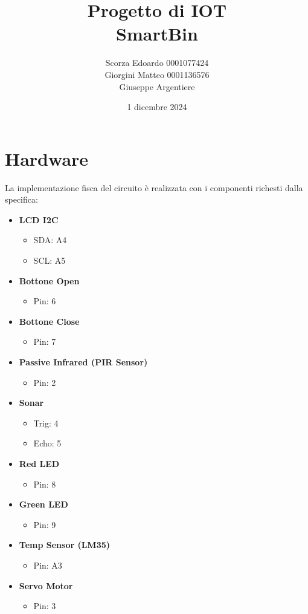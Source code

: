 \documentclass[a4paper,12pt]{report}
\title{Progetto di IOT
    \\ SmartBin}
\author{Scorza Edoardo 0001077424 \\ Giorgini Matteo 0001136576 \\ Giuseppe Argentiere }
\date{1 dicembre 2024}
\begin{document}
\maketitle
\tableofcontents
\chapter{Hardware}
La implementazione fisca del circuito è realizzata con i componenti 
richesti dalla specifica:
\begin{itemize}
    \item \textbf{LCD I2C}
    \begin{itemize}
        \item SDA: A4
        \item SCL: A5
    \end{itemize}
    \item \textbf{Bottone Open}
    \begin{itemize}
        \item Pin: 6
    \end{itemize}
    \item \textbf{Bottone Close}
    \begin{itemize}
        \item Pin: 7
    \end{itemize}
    \item \textbf{Passive Infrared (PIR Sensor)}
    \begin{itemize}
        \item Pin: 2
    \end{itemize}
    \item \textbf{Sonar}
    \begin{itemize}
        \item Trig: 4
        \item Echo: 5
    \end{itemize}
    \item \textbf{Red LED}
    \begin{itemize}
        \item Pin: 8
    \end{itemize}
    \item \textbf{Green LED}
    \begin{itemize}
        \item Pin: 9
    \end{itemize}
    \item \textbf{Temp Sensor (LM35)}
    \begin{itemize}
        \item Pin: A3
    \end{itemize}
    \item \textbf{Servo Motor}
    \begin{itemize}
        \item Pin: 3
    \end{itemize}
\end{itemize}
\end{document}
